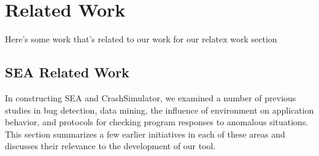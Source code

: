 \chapter{Related Work}
\label{chap:relatedwork}

Here's some work that's related to our work for our relatex work section

\section{SEA Related Work}
\label{sec:searelatedwork}
In constructing SEA and CrashSimulator, we examined a number of previous
studies in bug detection, data mining, the influence of environment on
application behavior, and protocols for checking program responses to anomalous
situations. This section
summarizes a few earlier initiatives in each of these areas and discusses
their relevance to the development of our tool.



\iffalse
While there is a vast amount of literature on test
generation~\cite{ammann2008introduction, mcminn2004search,
  puasuareanu2009survey, dias2007survey}, much less work
has focused on issues of portability, and tests of whether software
behaves consistently in different environments.  Prior work on
CheckAPI~\cite{rasley2015detecting} and
NetCheck~\cite{Zhuang_NSDI_2014} begins to fill this gap and this paper
builds upon those results.
%
%


Crash reproduction by test case mutation~\cite{DBLP:conf/sigsoft/XuanXM15}.

\fi


